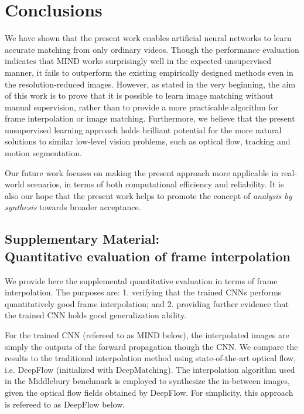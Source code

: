 \documentclass[runningheads]{llncs}
\begin{document}
	\vspace{-0.2cm}
		
	
	\vspace{-0.2cm}
	\section{Conclusions}
	\label{sec:discussion}
	\vspace{-0.2cm}
	
	We have shown that the present work enables artificial neural networks to learn accurate matching from only ordinary videos. Though the performance evaluation indicates that MIND works surprisingly well in the expected unsupervised manner, it fails to outperform the existing empirically designed methods even in the resolution-reduced images. However, as stated in the very beginning, the aim of this work is to prove that it is possible to learn image matching without manual supervision, rather than to provide a more practicable algorithm for frame interpolation or image matching. Furthermore, we believe that the present unsupervised learning approach holds brilliant potential for the more natural solutions to similar low-level vision problems, such as optical flow, tracking and motion segmentation.
	
	Our future work focuses on making the present approach more applicable in real-world scenarios, in terms of both computational efficiency and reliability. It is also our hope that the present work helps to promote the concept of \textit{analysis by synthesis} towards broader acceptance.
	
\subsection*{Supplementary Material: \\Quantitative evaluation of frame interpolation}

We provide here the supplemental quantitative evaluation in terms of frame interpolation. The purposes are: 1. verifying that the trained CNNs performs quantitatively good frame interpolation; and 2. providing further evidence that the trained CNN holds good generalization ability.
	
	For the trained CNN (refereed to as MIND below), the interpolated images are simply the outputs of the forward propagation though the CNN. We compare the results to the traditional interpolation method using state-of-the-art optical flow, i.e. DeepFlow \cite{weinzaepfel2013deepflow} (initialized with DeepMatching). The interpolation algorithm used in the Middlebury benchmark \cite{baker2011database} is employed to synthesize the in-between images, given the optical flow fields obtained by DeepFlow. For simplicity, this approach is refereed to as DeepFlow below.
\end{document}
